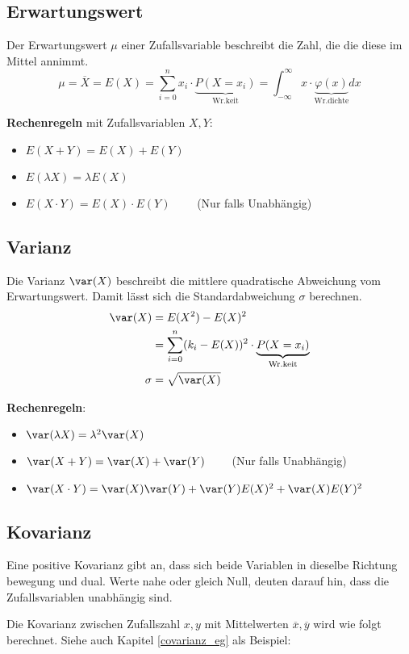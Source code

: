 \subsection{Erwartungswert}
Der Erwartungswert $\mu$ einer Zufallsvariable beschreibt die Zahl, die die diese im Mittel annimmt.
\[
\mu = \overline{X} = E(X)= \sum\limits_{i=0}^{n}x_i\cdot \underbrace{P(X=x_i)}_\text{Wr.keit} = \int_{-\infty}^{\infty}x\cdot \underbrace{\varphi(x)}_{\text{Wr.dichte}}dx
\]

\textbf{Rechenregeln} mit Zufallsvariablen $X, Y$:
\begin{itemize}[nosep]
	\item $E(X + Y) = E(X) + E(Y)$
	\item $E(\lambda X) = \lambda E(X)$ 
	\item $E(X\cdot Y) = E(X) \cdot E(Y) \qquad$  (Nur falls Unabhängig)
\end{itemize}

\subsection{Varianz}
Die Varianz $\var(X)$ beschreibt die mittlere quadratische Abweichung vom Erwartungswert. Damit lässt sich die Standardabweichung $\sigma$ berechnen.
\begin{align*}
	\var(X) &= E(X^2) - E(X)^2 \\
	&=\sum\limits_{i=0}^{n}(k_i - E(X))^2 \cdot \underbrace{P(X=x_i)}_\text{Wr.keit} \\
	\sigma &= \sqrt{\var(X)}	
\end{align*}

\noindent\textbf{Rechenregeln}:
\begin{itemize}[nosep]
	\item $\var(\lambda X) = \lambda^2\var(X)$
	\item $\var(X + Y) = \var(X) + \var(Y) \qquad$ (Nur falls Unabhängig)
	\item $\var(X\cdot Y) = \var(X)\var(Y) + \var(Y)E(X)^2 + \var(X)E(Y)^2$
\end{itemize}

\subsection{Kovarianz}
Eine positive Kovarianz gibt an, dass sich beide Variablen in dieselbe Richtung bewegung und dual. Werte nahe oder gleich Null, deuten darauf hin, dass die Zufallsvariablen unabhängig sind.

Die Kovarianz zwischen Zufallszahl $x,y$ mit Mittelwerten $\overline{x}, \overline{y}$ wird wie folgt berechnet. Siehe auch Kapitel \ref{covarianz_eg} als Beispiel:

